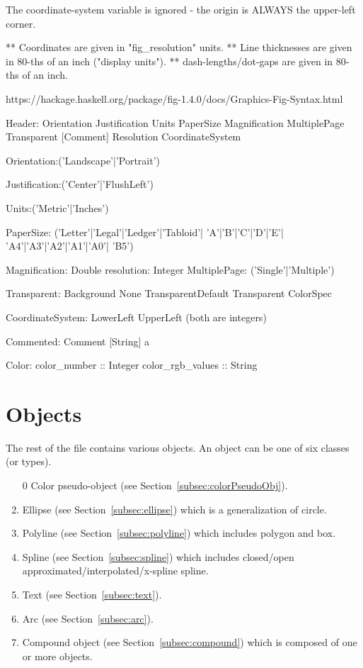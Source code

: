 \documentclass[10pt, a4paper]{article}
\begin{document}
    The coordinate-system variable is ignored - the origin is ALWAYS the
    upper-left corner.

    ** Coordinates are given in "fig\_resolution" units.
    ** Line thicknesses are given in 80-ths of an inch ("display units").
    ** dash-lengths/dot-gaps are given in 80-ths of an inch.


https://hackage.haskell.org/package/fig-1.4.0/docs/Graphics-Fig-Syntax.html



Header:
Orientation
Justification
Units
PaperSize
Magnification
MultiplePage
Transparent
[Comment]
Resolution
CoordinateSystem

Orientation:('Landscape'|'Portrait')

Justification:('Center'|'FlushLeft')

Units:('Metric'|'Inches')

PaperSize:
('Letter'|'Legal'|'Ledger'|'Tabloid'|
'A'|'B'|'C'|'D'|'E'|
'A4'|'A3'|'A2'|'A1'|'A0'|
'B5')

Magnification: Double
resolution: Integer
MultiplePage: ('Single'|'Multiple')


Transparent:
Background	 
None	 
TransparentDefault	 
Transparent ColorSpec	 


CoordinateSystem:
LowerLeft	 
UpperLeft	 
(both are integers)

Commented:
Comment [String] a	 


Color:
color\_number :: Integer
color\_rgb\_values :: String

\section{Objects}


The rest of the file contains various objects.  
An object can be one of six classes (or types).
%
\begin{enumerate}
\item[0]
Color pseudo-object (see Section~\ref{subsec:colorPseudoObj}). 
\item
Ellipse (see Section~\ref{subsec:ellipse}) which is a generalization of circle.
\item
Polyline (see Section~\ref{subsec:polyline}) which includes polygon and box.
\item
Spline (see Section~\ref{subsec:spline}) 
which includes closed/open approximated/interpolated/x-spline spline.
\item
Text (see Section~\ref{subsec:text}).
\item
Arc (see Section~\ref{subsec:arc}).
\item
Compound object (see Section~\ref{subsec:compound}) 
which is composed of one or more objects. 
\end{enumerate}
\end{document}
